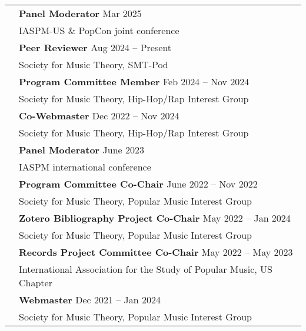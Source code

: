 \documentclass[letterpaper, 11pt]{article}
\begin{document}
\begin{longtable}{p{1.3in}p{4.8in}}
{\color{OliveGreen}{Professional Service}}
& \textbf{Panel Moderator} \hfill Mar 2025 \\
& IASPM-US \& PopCon joint conference \\
& \textbf{Peer Reviewer} \hfill Aug 2024  -- Present \\
& Society for Music Theory, SMT-Pod \\
& \textbf{Program Committee Member} \hfill Feb 2024  -- Nov 2024 \\
& Society for Music Theory, Hip-Hop/Rap Interest Group \\
& \textbf{Co-Webmaster} \hfill Dec 2022  -- Nov 2024 \\
& Society for Music Theory, Hip-Hop/Rap Interest Group \\
& \textbf{Panel Moderator} \hfill June 2023 \\
& IASPM international conference \\
& \textbf{Program Committee Co-Chair} \hfill June 2022  -- Nov 2022 \\
& Society for Music Theory, Popular Music Interest Group \\
& \textbf{Zotero Bibliography Project Co-Chair} \hfill May 2022  -- Jan 2024 \\
& Society for Music Theory, Popular Music Interest Group \\
& \textbf{Records Project Committee Co-Chair} \hfill May 2022  -- May 2023 \\
& International Association for the Study of Popular Music, US Chapter\\
& \textbf{Webmaster} \hfill Dec 2021  -- Jan 2024 \\
& Society for Music Theory, Popular Music Interest Group \\



\end{longtable}
\end{document}
